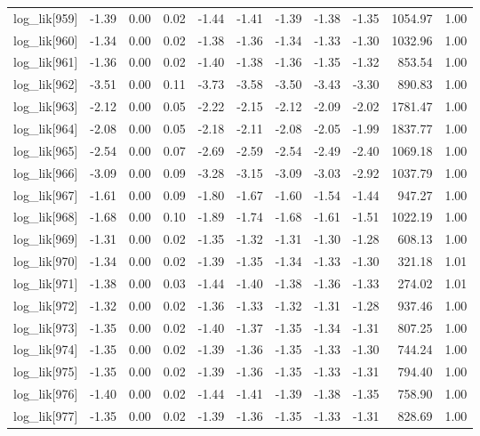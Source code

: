 \begin{table}[ht]
\begin{tabular}{rrrrrrrrrrr}
  log\_lik[959] & -1.39 & 0.00 & 0.02 & -1.44 & -1.41 & -1.39 & -1.38 & -1.35 & 1054.97 & 1.00 \\ 
  log\_lik[960] & -1.34 & 0.00 & 0.02 & -1.38 & -1.36 & -1.34 & -1.33 & -1.30 & 1032.96 & 1.00 \\ 
  log\_lik[961] & -1.36 & 0.00 & 0.02 & -1.40 & -1.38 & -1.36 & -1.35 & -1.32 & 853.54 & 1.00 \\ 
  log\_lik[962] & -3.51 & 0.00 & 0.11 & -3.73 & -3.58 & -3.50 & -3.43 & -3.30 & 890.83 & 1.00 \\ 
  log\_lik[963] & -2.12 & 0.00 & 0.05 & -2.22 & -2.15 & -2.12 & -2.09 & -2.02 & 1781.47 & 1.00 \\ 
  log\_lik[964] & -2.08 & 0.00 & 0.05 & -2.18 & -2.11 & -2.08 & -2.05 & -1.99 & 1837.77 & 1.00 \\ 
  log\_lik[965] & -2.54 & 0.00 & 0.07 & -2.69 & -2.59 & -2.54 & -2.49 & -2.40 & 1069.18 & 1.00 \\ 
  log\_lik[966] & -3.09 & 0.00 & 0.09 & -3.28 & -3.15 & -3.09 & -3.03 & -2.92 & 1037.79 & 1.00 \\ 
  log\_lik[967] & -1.61 & 0.00 & 0.09 & -1.80 & -1.67 & -1.60 & -1.54 & -1.44 & 947.27 & 1.00 \\ 
  log\_lik[968] & -1.68 & 0.00 & 0.10 & -1.89 & -1.74 & -1.68 & -1.61 & -1.51 & 1022.19 & 1.00 \\ 
  log\_lik[969] & -1.31 & 0.00 & 0.02 & -1.35 & -1.32 & -1.31 & -1.30 & -1.28 & 608.13 & 1.00 \\ 
  log\_lik[970] & -1.34 & 0.00 & 0.02 & -1.39 & -1.35 & -1.34 & -1.33 & -1.30 & 321.18 & 1.01 \\ 
  log\_lik[971] & -1.38 & 0.00 & 0.03 & -1.44 & -1.40 & -1.38 & -1.36 & -1.33 & 274.02 & 1.01 \\ 
  log\_lik[972] & -1.32 & 0.00 & 0.02 & -1.36 & -1.33 & -1.32 & -1.31 & -1.28 & 937.46 & 1.00 \\ 
  log\_lik[973] & -1.35 & 0.00 & 0.02 & -1.40 & -1.37 & -1.35 & -1.34 & -1.31 & 807.25 & 1.00 \\ 
  log\_lik[974] & -1.35 & 0.00 & 0.02 & -1.39 & -1.36 & -1.35 & -1.33 & -1.30 & 744.24 & 1.00 \\ 
  log\_lik[975] & -1.35 & 0.00 & 0.02 & -1.39 & -1.36 & -1.35 & -1.33 & -1.31 & 794.40 & 1.00 \\ 
  log\_lik[976] & -1.40 & 0.00 & 0.02 & -1.44 & -1.41 & -1.39 & -1.38 & -1.35 & 758.90 & 1.00 \\ 
  log\_lik[977] & -1.35 & 0.00 & 0.02 & -1.39 & -1.36 & -1.35 & -1.33 & -1.31 & 828.69 & 1.00 \\ 

\end{tabular}
\end{table}
